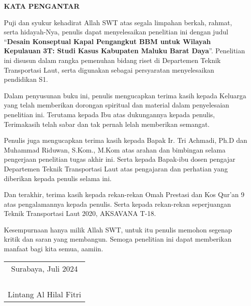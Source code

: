 \begin{center}
  \Large
  \textbf{KATA PENGANTAR}
\end{center}

\vspace{2ex}

Puji dan syukur kehadirat Allah SWT atas segala limpahan berkah, rahmat, serta hidayah-Nya, penulis  dapat menyelesaikan penelitian ini dengan judul
``\textbf{Desain Konseptual Kapal Pengangkut BBM untuk Wilayah Kepulauan 3T: Studi Kasus Kabupaten Maluku Barat Daya}''.
Penelitian ini disusun dalam rangka pemenuhan bidang riset di Departemen Teknik Transportasi Laut,
  serta digunakan sebagai persyaratan menyelesaikan pendidikan S1.

Dalam penyusunan buku ini,
  penulis mengucapkan terima kasih kepada Keluarga yang telah memberikan dorongan spiritual dan material dalam penyelesaian penelitian ini.
Terutama kepada Ibu atas dukungannya kepada penulis, Terimakasih telah sabar dan tak pernah lelah memberikan semangat.

Penulis juga mengucapkan terima kasih kepada Bapak Ir. Tri Achmadi, Ph.D 
  dan Muhammad Riduwan, S.Kom., M.Kom atas arahan dan bimbingan selama pengerjaan penelitian tugas akhir ini.
Serta kepada Bapak-ibu dosen pengajar Departemen Teknik Transportasi Laut atas pengajaran dan perhatian yang diberikan kepada penulis selama ini.

Dan terakhir,
  terima kasih kepada rekan-rekan Omah Prestasi dan Kos Qur'an 9 atas pengalamannya kepada penulis.
Serta kepada rekan-rekan seperjuangan Teknik Transportasi Laut 2020, AKSAVANA T-18.

Kesempurnaan hanya milik Allah SWT, untuk itu penulis memohon segenap kritik dan saran yang  membangun.
Semoga penelitian ini dapat memberikan manfaat bagi kita semua, aamiin.

\vspace{4ex}

\begin{flushright}
  \begin{tabular}[b]{c}
    Surabaya, Juli 2024\\
    \\
    \\
    \\
    \\
    Lintang Al Hilal Fitri
  \end{tabular}
\end{flushright}

